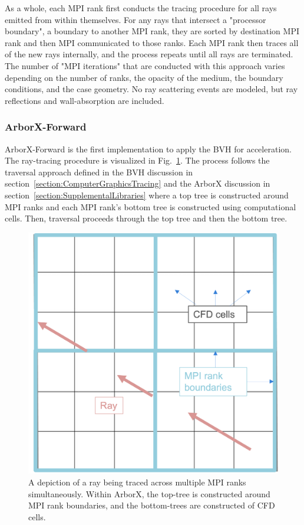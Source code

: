 As a whole, each MPI rank first conducts the tracing procedure for all rays emitted from within themselves. For any rays that intersect a "processor boundary", a boundary to another MPI rank, they are sorted by destination MPI rank and then MPI communicated to those ranks. Each MPI rank then traces all of the new rays internally, and the process repeats until all rays are terminated. The number of "MPI iterations" that are conducted with this approach varies depending on the number of ranks, the opacity of the medium, the boundary conditions, and the case geometry. No ray scattering events are modeled, but ray reflections and wall-absorption are included.


\subsubsection{ArborX-Forward}
ArborX-Forward is the first implementation to apply the BVH for acceleration. The ray-tracing procedure is visualized in Fig.~\ref{fig:FArborX_FlowChart}.
The process follows the traversal approach defined in the BVH discussion in section~\ref{section:ComputerGraphicsTracing} and the ArborX discussion in section~\ref{section:SupplementalLibraries} where a top tree is constructed around MPI ranks and each MPI rank's bottom tree is constructed using computational cells. Then, traversal proceeds through the top tree and then the bottom tree.

\begin{figure}
\centering
\includegraphics[width=0.5\linewidth]{figures/ch3/DistributedRayTracing.png}
\caption{A depiction of a ray being traced across multiple MPI ranks simultaneously. Within ArborX, the top-tree is constructed around MPI rank boundaries, and the bottom-trees are constructed of CFD cells.}
\label{fig:FArborX_FlowChart}
\end{figure}

